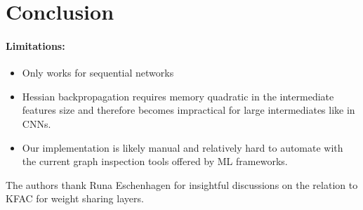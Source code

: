 \documentclass{article}
\begin{document}
\section{Conclusion}

\paragraph{Limitations:}
\begin{itemize}
\item Only works for sequential networks
\item Hessian backpropagation requires memory quadratic in the intermediate features size and therefore becomes impractical for large intermediates like in CNNs.
\item Our implementation is likely manual and relatively hard to automate with the current graph inspection tools offered by ML frameworks.
\end{itemize}

\begin{ack} %
  The authors thank Runa Eschenhagen for insightful discussions on the relation to KFAC for weight sharing layers.
\end{ack}




\appendix



\end{document}
